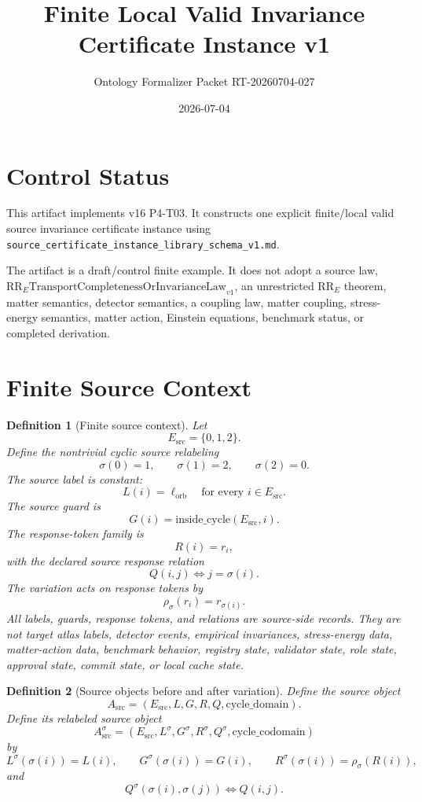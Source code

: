 \documentclass[11pt]{article}
\title{Finite Local Valid Invariance Certificate Instance v1}
\author{Ontology Formalizer Packet RT-20260704-027}
\date{2026-07-04}
\newcommand{\Esrc}{E_{\mathrm{src}}}
\newcommand{\Asrc}{A_{\mathrm{src}}}
\newcommand{\Asig}{A_{\mathrm{src}}^{\sigma}}
\newcommand{\RRE}{\mathrm{RR}_{E}}
\newcommand{\RRELaw}{\mathrm{RR}_{E}\mathrm{TransportCompletenessOrInvarianceLaw}_{v1}}
\newtheorem{definition}{Definition}
\begin{document}
\maketitle

\section{Control Status}

This artifact implements v16 P4-T03. It constructs one explicit finite/local
valid source invariance certificate instance using
\texttt{source\_certificate\_instance\_library\_schema\_v1.md}.

The artifact is a draft/control finite example. It does not adopt a source
law, \(\RRELaw\), an unrestricted \(\RRE\) theorem, matter semantics,
detector semantics, a coupling law, matter coupling, stress-energy semantics,
matter action, Einstein equations, benchmark status, or completed derivation.

\section{Finite Source Context}

\begin{definition}[Finite source context]
Let
\[
  \Esrc=\{0,1,2\}.
\]
Define the nontrivial cyclic source relabeling
\[
  \sigma(0)=1,\qquad \sigma(1)=2,\qquad \sigma(2)=0.
\]
The source label is constant:
\[
  L(i)=\ell_{\mathrm{orb}}\quad\text{for every }i\in\Esrc.
\]
The source guard is
\[
  G(i)=\mathrm{inside\_cycle}(\Esrc,i).
\]
The response-token family is
\[
  R(i)=r_i,
\]
with the declared source response relation
\[
  Q(i,j) \Longleftrightarrow j=\sigma(i).
\]
The variation acts on response tokens by
\[
  \rho_{\sigma}(r_i)=r_{\sigma(i)}.
\]
All labels, guards, response tokens, and relations are source-side records.
They are not target atlas labels, detector events, empirical invariances,
stress-energy data, matter-action data, benchmark behavior, registry state,
validator state, role state, approval state, commit state, or local cache
state.
\end{definition}

\begin{definition}[Source objects before and after variation]
Define the source object
\[
  \Asrc=(\Esrc,L,G,R,Q,\mathrm{cycle\_domain}).
\]
Define its relabeled source object
\[
  \Asig=(\Esrc,L^{\sigma},G^{\sigma},R^{\sigma},Q^{\sigma},
  \mathrm{cycle\_codomain})
\]
by
\[
  L^{\sigma}(\sigma(i))=L(i),\qquad
  G^{\sigma}(\sigma(i))=G(i),\qquad
  R^{\sigma}(\sigma(i))=\rho_{\sigma}(R(i)),
\]
and
\[
  Q^{\sigma}(\sigma(i),\sigma(j)) \Longleftrightarrow Q(i,j).
\]
\end{definition}
\end{document}
